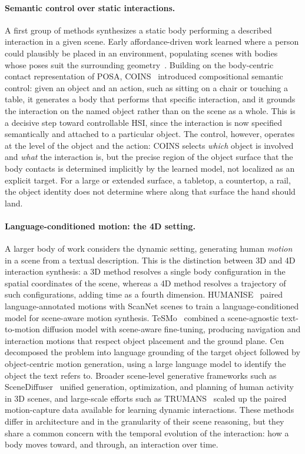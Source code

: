\paragraph{Semantic control over static interactions.} A first group of methods synthesizes a static body performing a described interaction in a given scene. Early affordance-driven work learned where a person could plausibly be placed in an environment, populating scenes with bodies whose poses suit the surrounding geometry~\cite{li2019putting}. Building on the body-centric contact representation of POSA, COINS~\cite{zhao2022coins} introduced compositional semantic control: given an object and an action, such as sitting on a chair or touching a table, it generates a body that performs that specific interaction, and it grounds the interaction on the named object rather than on the scene as a whole. This is a decisive step toward controllable HSI, since the interaction is now specified semantically and attached to a particular object. The control, however, operates at the level of the object and the action: COINS selects \emph{which} object is involved and \emph{what} the interaction is, but the precise region of the object surface that the body contacts is determined implicitly by the learned model, not localized as an explicit target. For a large or extended surface, a tabletop, a countertop, a rail, the object identity does not determine where along that surface the hand should land.

\paragraph{Language-conditioned motion: the 4D setting.} A larger body of work considers the dynamic setting, generating human \emph{motion} in a scene from a textual description. This is the distinction between 3D and 4D interaction synthesis: a 3D method resolves a single body configuration in the spatial coordinates of the scene, whereas a 4D method resolves a trajectory of such configurations, adding time as a fourth dimension. HUMANISE~\cite{wang2022humanise} paired language-annotated motions with ScanNet scenes to train a language-conditioned model for scene-aware motion synthesis. TeSMo~\cite{yi2024tesmo} combined a scene-agnostic text-to-motion diffusion model with scene-aware fine-tuning, producing navigation and interaction motions that respect object placement and the ground plane. Cen~\etal~\cite{cen2024textscenemotion} decomposed the problem into language grounding of the target object followed by object-centric motion generation, using a large language model to identify the object the text refers to. Broader scene-level generative frameworks such as SceneDiffuser~\cite{huang2023scenediffuser} unified generation, optimization, and planning of human activity in 3D scenes, and large-scale efforts such as TRUMANS~\cite{jiang2024trumans} scaled up the paired motion-capture data available for learning dynamic interactions. These methods differ in architecture and in the granularity of their scene reasoning, but they share a common concern with the temporal evolution of the interaction: how a body moves toward, and through, an interaction over time.

